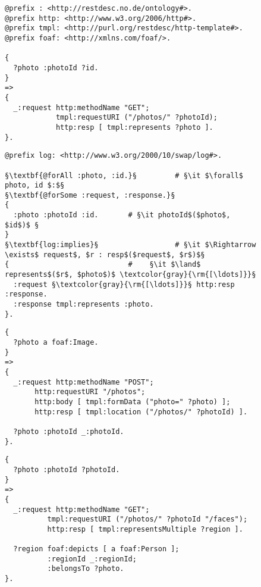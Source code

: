 \documentclass[runningheads,a4paper, twocolumn]{llncs}
\begin{document}
\begin{figure}[float=t!]
\vspace{.3em}
\begin{lstlisting}[caption=RESTdesc description of photo retrieval,
                   label=lst:PhotoGet, escapechar=§]
@prefix : <http://restdesc.no.de/ontology#>.
@prefix http: <http://www.w3.org/2006/http#>.
@prefix tmpl: <http://purl.org/restdesc/http-template#>.
@prefix foaf: <http://xmlns.com/foaf/>.

{
  ?photo :photoId ?id.
}
=>
{
  _:request http:methodName "GET";
            tmpl:requestURI ("/photos/" ?photoId);
            http:resp [ tmpl:represents ?photo ].
}.
\end{lstlisting}

\begin{lstlisting}[caption=\autoref{lst:PhotoGet} with explicit quantifiers,
                   label=lst:PhotoGetQuantifiers, escapechar=§]
@prefix log: <http://www.w3.org/2000/10/swap/log#>.

§\textbf{@forAll :photo, :id.}§         # §\it $\forall$ photo, id $:$§
§\textbf{@forSome :request, :response.}§
{
  :photo :photoId :id.       # §\it photoId$($photo$, $id$)$ §
}
§\textbf{log:implies}§                  # §\it $\Rightarrow \exists$ request$, $r : resp$($request$, $r$)$§
{                            #    §\it $\land$ represents$($r$, $photo$)$ \textcolor{gray}{\rm{[\ldots]}}§
  :request §\textcolor{gray}{\rm{[\ldots]}}§ http:resp :response.
  :response tmpl:represents :photo.
}.
\end{lstlisting}

\begin{lstlisting}[caption=RESTdesc description of photo upload,
                   label=lst:PhotoUpload, escapechar=§]
{
  ?photo a foaf:Image.
}
=>
{
  _:request http:methodName "POST";
       http:requestURI "/photos";
       http:body [ tmpl:formData ("photo=" ?photo) ];
       http:resp [ tmpl:location ("/photos/" ?photoId) ].

  ?photo :photoId _:photoId.
}.
\end{lstlisting}

\begin{lstlisting}[caption=RESTdesc description of face detection,
                   label=lst:FaceDetection, escapechar=§]
{
  ?photo :photoId ?photoId.
}
=>
{
  _:request http:methodName "GET";
          tmpl:requestURI ("/photos/" ?photoId "/faces");
          http:resp [ tmpl:representsMultiple ?region ].
  
  ?region foaf:depicts [ a foaf:Person ];
          :regionId _:regionId;
          :belongsTo ?photo.
}.
\end{lstlisting}


\end{figure}
\end{document}
